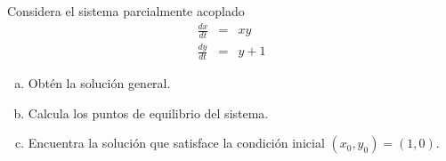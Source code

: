 \documentclass[12pt]{exam}
\begin{document}
\begin{questions}
     \question%
     Considera el sistema parcialmente acoplado $$\begin{array}{rcl}
          \frac{dx}{dt}&=&xy  \\
          \frac{dy}{dt}&=&y+1 
     \end{array}$$
     \begin{enumerate}[a)]
         \item Obtén la solución general.
         \item Calcula los puntos de equilibrio del sistema.
         \item Encuentra la solución que satisface la condición inicial $(x_0,y_0)=(1,0)$.
     \end{enumerate}



    \end{questions}
\end{document}
